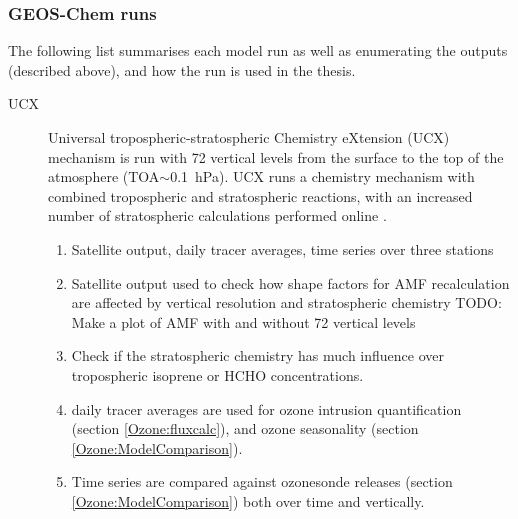     \subsubsection{GEOS-Chem runs}
      \label{Model:GC:simulation:runs}
      
      The following list summarises each model run as well as enumerating the outputs (described above), and how the run is used in the thesis.
      \begin{description}
        \item[UCX]%
          Universal tropospheric-stratospheric Chemistry eXtension (UCX) mechanism is run with 72 vertical levels from the surface to the top of the atmosphere (TOA$\sim$0.1~hPa).
          UCX runs a chemistry mechanism with combined tropospheric and stratospheric reactions, with an increased number of stratospheric calculations performed online \parencite{Eastham2014}.
          \begin{enumerate}
            \item Satellite output, daily tracer averages, time series over three stations
            \item Satellite output used to check how shape factors for AMF recalculation are affected by vertical resolution and stratospheric chemistry 
            TODO: Make a plot of AMF with and without 72 vertical levels
            \item Check if the stratospheric chemistry has much influence over tropospheric isoprene or HCHO concentrations.
            \item daily tracer averages are used for ozone intrusion quantification (section \ref{Ozone:fluxcalc}), and ozone seasonality (section \ref{Ozone:ModelComparison}).
            \item Time series are compared against ozonesonde releases (section \ref{Ozone:ModelComparison}) both over time and vertically.
          \end{enumerate}
        

\end{description}
